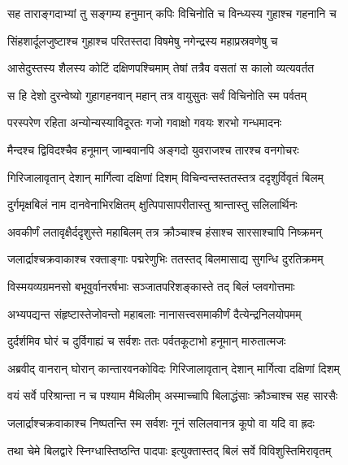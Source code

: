 
\twolineshloka
{सह ताराङ्गदाभ्यां तु सङ्गम्य हनुमान् कपिः}
{विचिनोति च विन्ध्यस्य गुहाश्च गहनानि च} %

\twolineshloka
{सिंहशार्दूलजुष्टाश्च गुहाश्च परितस्तदा}
{विषमेषु नगेन्द्रस्य महाप्रस्रवणेषु च} %

\twolineshloka
{आसेदुस्तस्य शैलस्य कोटिं दक्षिणपश्चिमाम्}
{तेषां तत्रैव वसतां स कालो व्यत्यवर्तत} %

\twolineshloka
{स हि देशो दुरन्वेष्यो गुहागहनवान् महान्}
{तत्र वायुसुतः सर्वं विचिनोति स्म पर्वतम्} %

\twolineshloka
{परस्परेण रहिता अन्योन्यस्याविदूरतः}
{गजो गवाक्षो गवयः शरभो गन्धमादनः} %

\twolineshloka
{मैन्दश्च द्विविदश्चैव हनूमान् जाम्बवानपि}
{अङ्गदो युवराजश्च तारश्च वनगोचरः} %

\twolineshloka
{गिरिजालावृतान् देशान् मार्गित्वा दक्षिणां दिशम्}
{विचिन्वन्तस्ततस्तत्र ददृशुर्विवृतं बिलम्} %

\twolineshloka
{दुर्गमृक्षबिलं नाम दानवेनाभिरक्षितम्}
{क्षुत्पिपासापरीतास्तु श्रान्तास्तु सलिलार्थिनः} %

\twolineshloka
{अवकीर्णं लतावृक्षैर्ददृशुस्ते महाबिलम्}
{तत्र क्रौञ्चाश्च हंसाश्च सारसाश्चापि निष्क्रमन्} %

\twolineshloka
{जलार्द्राश्चक्रवाकाश्च रक्ताङ्गाः पद्मरेणुभिः}
{ततस्तद् बिलमासाद्य सुगन्धि दुरतिक्रमम्} %

\twolineshloka
{विस्मयव्यग्रमनसो बभूवुर्वानरर्षभाः}
{सञ्जातपरिशङ्कास्ते तद् बिलं प्लवगोत्तमाः} %

\twolineshloka
{अभ्यपद्यन्त संहृष्टास्तेजोवन्तो महाबलाः}
{नानासत्त्वसमाकीर्णं दैत्येन्द्रनिलयोपमम्} %

\twolineshloka
{दुर्दर्शमिव घोरं च दुर्विगाह्यं च सर्वशः}
{ततः पर्वतकूटाभो हनूमान् मारुतात्मजः} %

\twolineshloka
{अब्रवीद् वानरान् घोरान् कान्तारवनकोविदः}
{गिरिजालावृतान् देशान् मार्गित्वा दक्षिणां दिशम्} %

\twolineshloka
{वयं सर्वे परिश्रान्ता न च पश्याम मैथिलीम्}
{अस्माच्चापि बिलाद्धंसाः क्रौञ्चाश्च सह सारसैः} %

\twolineshloka
{जलार्द्राश्चक्रवाकाश्च निष्पतन्ति स्म सर्वशः}
{नूनं सलिलवानत्र कूपो वा यदि वा ह्रदः} %

\twolineshloka
{तथा चेमे बिलद्वारे स्निग्धास्तिष्ठन्ति पादपाः}
{इत्युक्तास्तद् बिलं सर्वे विविशुस्तिमिरावृतम्} %

